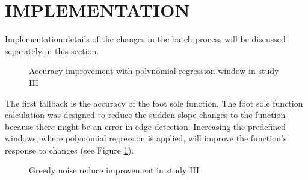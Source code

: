 \section{IMPLEMENTATION}\label{sec:StudyIIIImplementation}

Implementation details of the changes in the batch process will be discussed separately in this section.

\begin{figure}[htbp]
\centering
{}
\caption{Accuracy improvement with polynomial regression window in study III}
\label{fig:StudyIIIPredefinedWindows}
\end{figure}

The first fallback is the accuracy of the foot sole function. The foot sole function calculation was designed to reduce the sudden slope changes to the function because there might be an error in edge detection. Increasing the predefined windows, where polynomial regression is applied, will improve the function’s response to changes (see Figure \ref{fig:StudyIIIPredefinedWindows}).

\begin{figure}[htbp]
\centering
{}
\caption{Greedy noise reduce improvement in study III}
\label{fig:StudyIIINoiseReduce}
\end{figure}

